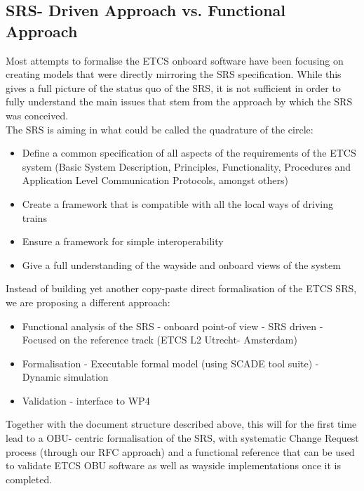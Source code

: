 \subsection{SRS- Driven Approach vs. Functional Approach}

Most attempts to formalise the ETCS onboard software have been focusing on creating models that were directly mirroring the SRS specification.
While this gives a full picture of the status quo of the SRS, it is not sufficient in order to fully understand the main issues that stem from the approach by which the SRS was conceived. \\
%
The SRS is aiming in what could be called the quadrature of the circle:
\begin{itemize}
\item Define a common specification of all aspects of the requirements of the ETCS system (Basic System Description, Principles, Functionality, Procedures and Application Level Communication Protocols, amongst others)
\item Create a framework that is compatible with all the local ways of driving trains
\item Ensure a framework for simple interoperability 
\item Give a full understanding of the wayside and onboard views of the system
\end {itemize}

Instead of building yet another copy-paste direct formalisation of the ETCS SRS, we are proposing a different approach:
%
\begin{itemize}
\item Functional analysis of the SRS
- onboard point-of view
- SRS driven
- Focused on the reference track (ETCS L2 Utrecht- Amsterdam)
\item Formalisation
- Executable formal model (using SCADE tool suite)
- Dynamic simulation 
\item Validation
- interface to WP4
\end{itemize}

Together with the document structure described above, this will for the first time lead to a OBU- centric formalisation of the SRS, with systematic Change Request process (through our RFC approach) and a functional reference that can be used to validate ETCS OBU software as well as wayside implementations once it is completed.\\

